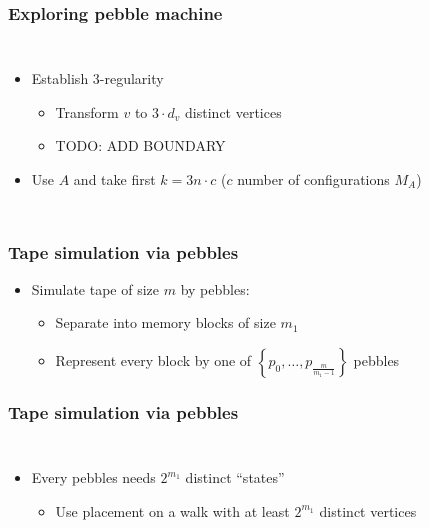 \documentclass{beamer}
\begin{document}
\begin{frame}
  \frametitle{Exploring pebble machine}
  \begin{columns}
    \begin{itemize}
      \item<3-> Establish 3-regularity
        \begin{itemize}
          \item Transform $v$ to $3\cdot d_{v}$ distinct vertices
          \item TODO: ADD BOUNDARY
        \end{itemize}
      \item<5-> Use $A$ and take first $k = 3n\cdot c$ ($c$ number of
        configurations $M_{A}$)
    \end{itemize}
  \end{columns}
\end{frame}

\begin{frame}
  \frametitle{Tape simulation via pebbles}
  \begin{itemize}
    \item Simulate tape of size $m$ by pebbles:
      \begin{itemize}
        \item<3-> Separate into memory blocks of size $m_{1}$
        \item<4-> Represent every block by one of $\left\{p_{0},\dots,p_{\frac{m}{m_{1}-1}}\right\}$ pebbles
      \end{itemize}
  \end{itemize}
\end{frame}

\begin{frame}
  \frametitle{Tape simulation via pebbles}
  
  \begin{columns}
    \begin{itemize}
      \item Every pebbles needs $2^{m_{1}}$ distinct \enquote{states}
        \begin{itemize}
          \item Use placement on a walk with at least $2^{m_{1}}$ distinct vertices
        \end{itemize}
    \end{itemize}
    \resizebox{\textwidth}{!}{}
  \end{columns}
\end{frame}
\end{document}
